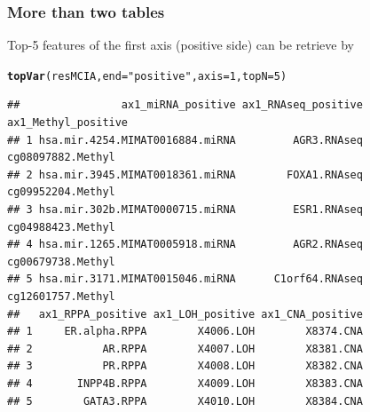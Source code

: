 \documentclass[10pt,xcolor=dvipsnames]{beamer}\usepackage[]{graphicx}\usepackage[]{color}
\makeatletter
\newcommand{\hlnum}[1]{\textcolor[rgb]{0.686,0.059,0.569}{#1}}%
\newcommand{\hlstr}[1]{\textcolor[rgb]{0.192,0.494,0.8}{#1}}%
\newcommand{\hlstd}[1]{\textcolor[rgb]{0.345,0.345,0.345}{#1}}%
\newcommand{\hlkwc}[1]{\textcolor[rgb]{0.333,0.667,0.333}{#1}}%
\newcommand{\hlkwd}[1]{\textcolor[rgb]{0.737,0.353,0.396}{\textbf{#1}}}%
\newenvironment{kframe}{%
 \def\at@end@of@kframe{}%
 \ifinner\ifhmode%
  \def\at@end@of@kframe{\end{minipage}}%
  \begin{minipage}{\columnwidth}%
 \fi\fi%
 \def\FrameCommand##1{\hskip\@totalleftmargin \hskip-\fboxsep
 \colorbox{shadecolor}{##1}\hskip-\fboxsep
     \hskip-\linewidth \hskip-\@totalleftmargin \hskip\columnwidth}%
 \MakeFramed {\advance\hsize-\width
   \@totalleftmargin\z@ \linewidth\hsize
   \@setminipage}}%
 {\par\unskip\endMakeFramed%
 \at@end@of@kframe}
\newenvironment{knitrout}{}{} %
\makeatother
\begin{document}
\begin{frame}\frametitle{More than two tables}

Top-5 features of the first axis (positive side) can be retrieve by

\scriptsize
\begin{knitrout}\footnotesize
{}\color{fgcolor}\begin{kframe}
\begin{alltt}
\hlkwd{topVar}\hlstd{(resMCIA,} \hlkwc{end}\hlstd{=}\hlstr{"positive"}\hlstd{,} \hlkwc{axis}\hlstd{=}\hlnum{1}\hlstd{,} \hlkwc{topN}\hlstd{=}\hlnum{5}\hlstd{)}
\end{alltt}
\begin{verbatim}
##                ax1_miRNA_positive ax1_RNAseq_positive ax1_Methyl_positive
## 1 hsa.mir.4254.MIMAT0016884.miRNA         AGR3.RNAseq   cg08097882.Methyl
## 2 hsa.mir.3945.MIMAT0018361.miRNA        FOXA1.RNAseq   cg09952204.Methyl
## 3 hsa.mir.302b.MIMAT0000715.miRNA         ESR1.RNAseq   cg04988423.Methyl
## 4 hsa.mir.1265.MIMAT0005918.miRNA         AGR2.RNAseq   cg00679738.Methyl
## 5 hsa.mir.3171.MIMAT0015046.miRNA      C1orf64.RNAseq   cg12601757.Methyl
##   ax1_RPPA_positive ax1_LOH_positive ax1_CNA_positive
## 1     ER.alpha.RPPA        X4006.LOH        X8374.CNA
## 2           AR.RPPA        X4007.LOH        X8381.CNA
## 3           PR.RPPA        X4008.LOH        X8382.CNA
## 4       INPP4B.RPPA        X4009.LOH        X8383.CNA
## 5        GATA3.RPPA        X4010.LOH        X8384.CNA
\end{verbatim}
\end{kframe}
\end{knitrout}

\end{frame}
\end{document}

